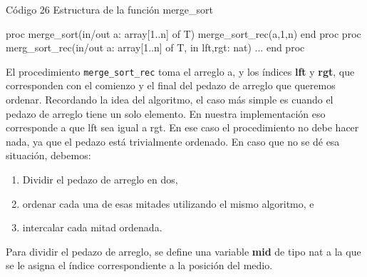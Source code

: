 \begin{codebox}{Código 26}
\footnotesize Estructura de la función merge\_sort
\tcblower
\begin{pascallike}
proc merge_sort(in/out a: array[1..n] of T)
    merge_sort_rec(a,1,n)
end proc
proc merg_sort_rec(in/out a: array[1..n] of T, in lft,rgt: nat)
...
end proc
\end{pascallike}
\end{codebox}

El procedimiento \texttt{merge\_sort\_rec} toma el arreglo a, y los índices \textbf{lft} y \textbf{rgt}, que corresponden con el comienzo y el final del pedazo de arreglo que queremos ordenar. Recordando la idea del algoritmo, el caso más simple es cuando el pedazo de arreglo tiene un solo elemento. En nuestra implementación eso corresponde a que lft sea igual a rgt. En ese caso el procedimiento no debe hacer nada, ya que el pedazo está trivialmente ordenado.
En caso que no se dé esa situación, debemos:
\begin{enumerate}
    \item Dividir el pedazo de arreglo en dos,
    \item ordenar cada una de esas mitades utilizando el mismo algoritmo, e
    \item intercalar cada mitad ordenada.
\end{enumerate}
Para dividir el pedazo de arreglo, se define una variable \textbf{mid} de tipo nat a la que se le asigna el índice correspondiente a la posición del medio.

